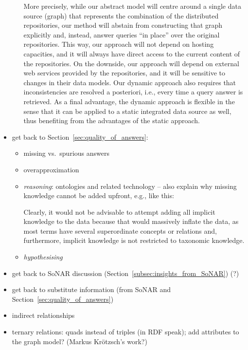 \begin{itemize}
\begin{itemize}
        More precisely, while our abstract model will centre around a single data source (graph)
        that represents the combination of the distributed repositories,
        our method will abstain from constructing that graph explicitly and, instead,
        answer queries \enquote{in place} over the original repositories.
        This way, our approach will not depend on hosting capacities,
        and it will always have direct access to the current content of the repositories.
        On the downside, our approach will depend on external web services provided by the repositories,
        and it will be sensitive to changes in their data models.
        Our dynamic approach also requires that inconsistencies are resolved
        a posteriori, i.e., every time a query answer is retrieved.
        As a final advantage, the dynamic approach is flexible
        in the sense that it can be applied to a static integrated data source as well,
        thus benefiting from the advantages of the static approach.
  \end{itemize}
  \item
    get back to Section~\ref{sec:quality_of_answers}:
    \begin{itemize}
      \item
        missing vs.\ spurious answers
      \item
        overapproximation
      \item
        \emph{reasoning}: ontologies and related technology -- also explain why
        missing knowledge cannot be added upfront, e.g., like this:
        
        Clearly, it would not be advisable to attempt adding all implicit knowledge to the data
        because that would massively inflate the data,
        as most terms have several superordinate concepts or relations and,
        furthermore, implicit knowledge is not restricted to taxonomic knowledge.
      \item
        \emph{hypothesising}
    \end{itemize}
  \item
    get back to SoNAR discussion (Section~\ref{subsec:insights_from_SoNAR}) (?)
  \item
    get back to substitute information (from SoNAR and Section~\ref{sec:quality_of_answers})
  \item
    indirect relationships
  \item
    ternary relations: quads instead of triples (in \gls{RDF} speak); add attributes to the graph model? (Markus Krötzsch's work?)
\end{itemize}
